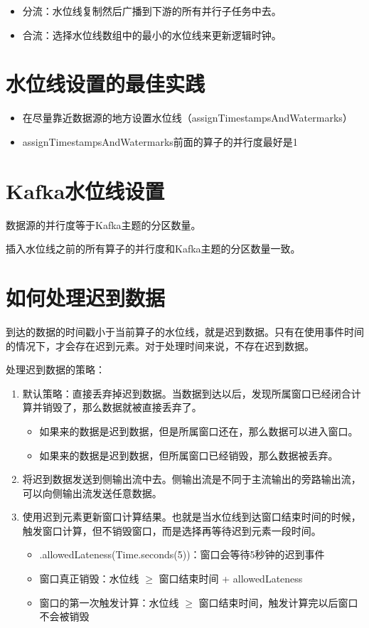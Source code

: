 \documentclass[cn,11pt,chinese]{elegantbook}
\begin{document}
\begin{itemize}
  \item 分流：水位线复制然后广播到下游的所有并行子任务中去。
  \item 合流：选择水位线数组中的最小的水位线来更新逻辑时钟。
\end{itemize}

\section{水位线设置的最佳实践}

\begin{itemize}
  \item 在尽量靠近数据源的地方设置水位线（assignTimestampsAndWatermarks）
  \item assignTimestampsAndWatermarks前面的算子的并行度最好是1
\end{itemize}

\section{Kafka水位线设置}

数据源的并行度等于Kafka主题的分区数量。

插入水位线之前的所有算子的并行度和Kafka主题的分区数量一致。

\section{如何处理迟到数据}

到达的数据的时间戳小于当前算子的水位线，就是迟到数据。只有在使用事件时间的情况下，才会存在迟到元素。对于处理时间来说，不存在迟到数据。

处理迟到数据的策略：

\begin{enumerate}
  \item 默认策略：直接丢弃掉迟到数据。当数据到达以后，发现所属窗口已经闭合计算并销毁了，那么数据就被直接丢弃了。
    \begin{itemize}
      \item 如果来的数据是迟到数据，但是所属窗口还在，那么数据可以进入窗口。
      \item 如果来的数据是迟到数据，但所属窗口已经销毁，那么数据被丢弃。
    \end{itemize}
  \item 将迟到数据发送到侧输出流中去。侧输出流是不同于主流输出的旁路输出流，可以向侧输出流发送任意数据。
  \item 使用迟到元素更新窗口计算结果。也就是当水位线到达窗口结束时间的时候，触发窗口计算，但不销毁窗口，而是选择再等待迟到元素一段时间。
    \begin{itemize}
      \item .allowedLateness(Time.seconds(5))：窗口会等待5秒钟的迟到事件
      \item 窗口真正销毁：水位线 $\ge$ 窗口结束时间 + allowedLateness
      \item 窗口的第一次触发计算：水位线 $\ge$ 窗口结束时间，触发计算完以后窗口不会被销毁
    \end{itemize}
\end{enumerate}
\end{document}
